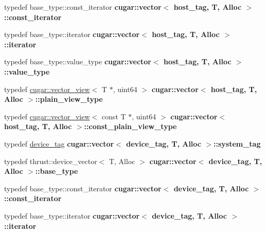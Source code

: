 \begin{DoxyCompactItemize}
typedef base\+\_\+type\+::const\+\_\+iterator {\bfseries cugar\+::vector$<$ host\+\_\+tag, T, Alloc $>$\+::const\+\_\+iterator}
\item 
\mbox{\label{group___basic_ga71046d92cdaf87d7772dc105e98065ee}} 
typedef base\+\_\+type\+::iterator {\bfseries cugar\+::vector$<$ host\+\_\+tag, T, Alloc $>$\+::iterator}
\item 
\mbox{\label{group___basic_ga7400d1b63831b7a8b1b12b6b3bdcd532}} 
typedef base\+\_\+type\+::value\+\_\+type {\bfseries cugar\+::vector$<$ host\+\_\+tag, T, Alloc $>$\+::value\+\_\+type}
\item 
\mbox{\label{group___basic_gaabda00511d23039e0c5c44f91db7cc54}} 
typedef \hyperlink{structcugar_1_1vector__view}{cugar\+::vector\+\_\+view}$<$ T $\ast$, uint64 $>$ {\bfseries cugar\+::vector$<$ host\+\_\+tag, T, Alloc $>$\+::plain\+\_\+view\+\_\+type}
\item 
\mbox{\label{group___basic_gaac278aee9d6adf8d1d1154c3b35cda97}} 
typedef \hyperlink{structcugar_1_1vector__view}{cugar\+::vector\+\_\+view}$<$ const T $\ast$, uint64 $>$ {\bfseries cugar\+::vector$<$ host\+\_\+tag, T, Alloc $>$\+::const\+\_\+plain\+\_\+view\+\_\+type}
\item 
\mbox{\label{group___basic_gaf14d85b2dde51ec6409dede5c364c8a7}} 
typedef \hyperlink{structcugar_1_1device__tag}{device\+\_\+tag} {\bfseries cugar\+::vector$<$ device\+\_\+tag, T, Alloc $>$\+::system\+\_\+tag}
\item 
\mbox{\label{group___basic_ga18b87d9081c5e8b9358850d7e0cdd9da}} 
typedef thrust\+::device\+\_\+vector$<$ T, Alloc $>$ {\bfseries cugar\+::vector$<$ device\+\_\+tag, T, Alloc $>$\+::base\+\_\+type}
\item 
\mbox{\label{group___basic_ga1b225ab140eb9c5426a6d2b533cea3e4}} 
typedef base\+\_\+type\+::const\+\_\+iterator {\bfseries cugar\+::vector$<$ device\+\_\+tag, T, Alloc $>$\+::const\+\_\+iterator}
\item 
\mbox{\label{group___basic_ga58b0146d7ff6238e19e18653edd525a0}} 
typedef base\+\_\+type\+::iterator {\bfseries cugar\+::vector$<$ device\+\_\+tag, T, Alloc $>$\+::iterator}

\end{DoxyCompactItemize}
